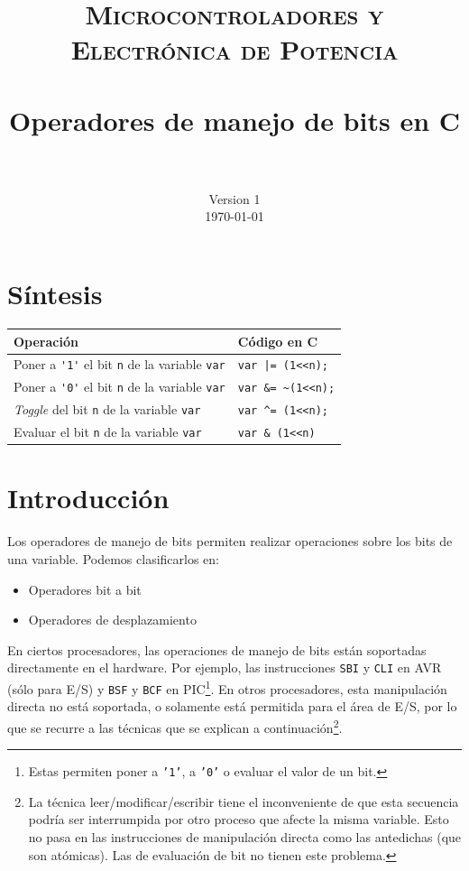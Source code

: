 \documentclass[paper=a4, fontsize=11pt]{scrartcl}	%
\title{%
		\usefont{OT1}{bch}{b}{n}
		\normalfont \normalsize \textsc{Microcontroladores y Electrónica de
    Potencia} \\ [25pt]
		\horrule{0.5pt} \\[0.4cm]
		\huge Operadores de manejo de bits en C\\
		\horrule{2pt} \\[0.5cm]
}
\author{%
		\normalfont 								\normalsize
        Version 1 \\[-3pt]		\normalsize
        \today
}
\date{}
\numberwithin{equation}{section} %
\numberwithin{figure}{section} %
\numberwithin{table}{section} %
\begin{document}
\maketitle

\section{Síntesis}

\begin{table}[h]
  \centering
  \begin{tabular} {l | l}
    \hline
    \textbf{Operación} & \textbf{Código en C} \\ \hline
    Poner a \verb|'1'| el bit \verb|n| de la variable \verb|var| & \verb!var |= (1<<n);! \\
    Poner a \verb|'0'| el bit \verb|n| de la variable \verb|var| & \verb!var &= ~(1<<n);! \\
    \emph{Toggle} del bit \verb|n| de la variable   \verb|var| & \verb!var ^= (1<<n);! \\
    Evaluar el bit \verb|n| de la variable   \verb|var| & \verb!var & (1<<n)! \\
    \hline
  \end{tabular}
\end{table}

\section{Introducción}

Los operadores de manejo de bits permiten realizar operaciones sobre los
bits de una variable.
Podemos clasificarlos en:
\begin{itemize}
  \item Operadores {bit a bit}
  \item Operadores de desplazamiento
\end{itemize}
En ciertos procesadores, las operaciones de manejo de bits están
soportadas directamente en el hardware. Por ejemplo, las instrucciones
\verb|SBI| y \verb|CLI| en AVR  (sólo para E/S) y \verb|BSF| y
\verb|BCF| en PIC\footnote{Estas permiten poner a \texttt{'1'}, a
\texttt{'0'} o evaluar el valor de un bit.}. En otros procesadores, esta
manipulación directa no está soportada, o solamente está permitida para
el área de E/S, por lo que se recurre a las técnicas que se explican a
continuación\footnote{La técnica leer/modificar/escribir tiene el
inconveniente de que esta secuencia podría ser interrumpida por otro
proceso que afecte la misma variable.  Esto no pasa en las instrucciones
de manipulación directa como las antedichas (que son atómicas). Las de
evaluación de bit no tienen este problema.}.
\end{document}

